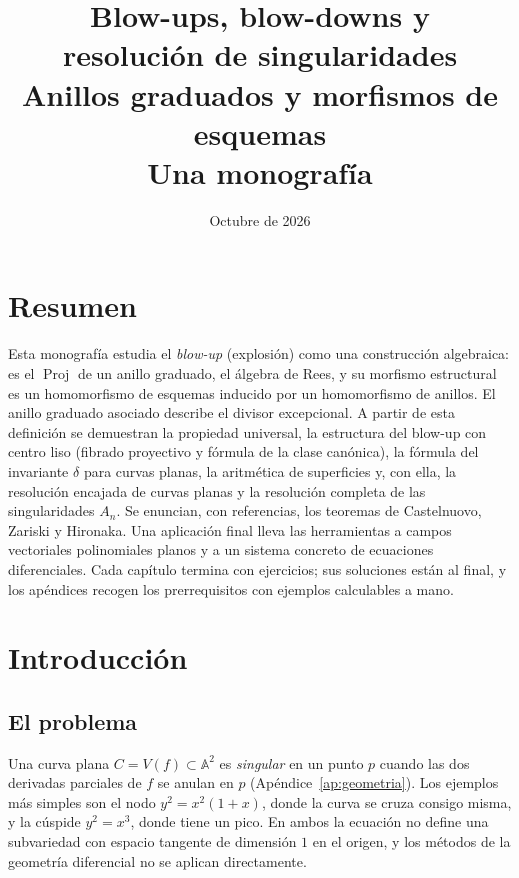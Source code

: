 \documentclass[11pt,a4paper,oneside]{book}
\title{\textbf{Blow-ups, blow-downs y\\ resolución de singularidades}\\[10pt]
\Large Anillos graduados y morfismos de esquemas\\[4pt]
\large Una monografía}
\author{}
\date{Octubre de 2026}
\newcommand{\Proj}{\operatorname{Proj}}
\newcommand{\A}{\mathbb{A}}
\theoremstyle{plain}
\theoremstyle{definition}
\theoremstyle{remark}
\newcounter{ejer}[chapter]
\begin{document}
\frontmatter
\maketitle

\chapter*{Resumen}
Esta monografía estudia el \emph{blow-up} (explosión) como una construcción algebraica: es el $\Proj$ de un anillo graduado, el álgebra de Rees, y su morfismo estructural es un homomorfismo de esquemas inducido por un homomorfismo de anillos. El anillo graduado asociado describe el divisor excepcional. A partir de esta definición se demuestran la propiedad universal, la estructura del blow-up con centro liso (fibrado proyectivo y fórmula de la clase canónica), la fórmula del invariante $\delta$ para curvas planas, la aritmética de superficies y, con ella, la resolución encajada de curvas planas y la resolución completa de las singularidades $A_n$. Se enuncian, con referencias, los teoremas de Castelnuovo, Zariski y Hironaka. Una aplicación final lleva las herramientas a campos vectoriales polinomiales planos y a un sistema concreto de ecuaciones diferenciales. Cada capítulo termina con ejercicios; sus soluciones están al final, y los apéndices recogen los prerrequisitos con ejemplos calculables a mano.

\tableofcontents

\mainmatter
\chapter{Introducción}\label{cap:intro}

\section{El problema}

Una curva plana $C=V(f)\subset\A^2$ es \emph{singular} en un punto $p$ cuando las dos derivadas parciales de $f$ se anulan en $p$ (Apéndice~\ref{ap:geometria}). Los ejemplos más simples son el nodo $y^2=x^2(1+x)$, donde la curva se cruza consigo misma, y la cúspide $y^2=x^3$, donde tiene un pico. En ambos la ecuación no define una subvariedad con espacio tangente de dimensión $1$ en el origen, y los métodos de la geometría diferencial no se aplican directamente.
\end{document}
